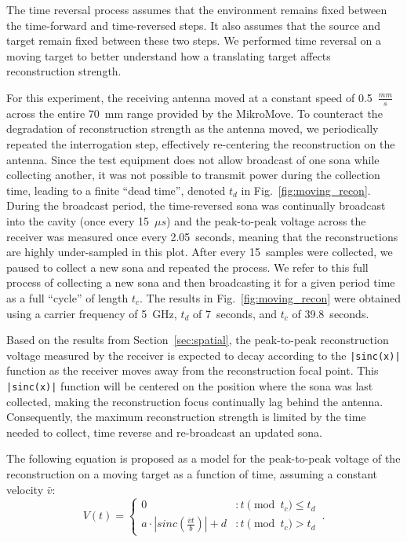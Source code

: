 The time reversal process assumes that the environment remains fixed between the
time-forward and time-reversed steps.
%
It also assumes that the source and target remain fixed between these two steps.
%
We performed time reversal on a moving target to better understand how a
translating target affects reconstruction strength.



For this experiment, the receiving antenna moved at a constant speed of
0.5~$\frac{mm}{s}$ across the entire 70~mm range provided by the MikroMove.
%
To counteract the degradation of reconstruction strength as the antenna moved,
we periodically repeated the interrogation step, effectively re-centering the
reconstruction on the antenna.
%
Since the test equipment does not allow broadcast of one sona while collecting
another, it was not possible to transmit power during the collection time,
leading to a finite ``dead time'', denoted $t_d$ in Fig.~\ref{fig:moving_recon}.
%
During the broadcast period, the time-reversed sona was continually broadcast
into the cavity (once every 15~$\mu s$) and the peak-to-peak voltage across the
receiver was measured once every 2.05~seconds, meaning that the reconstructions
are highly under-sampled in this plot.
%
After every 15~samples were collected, we paused to collect a new sona and
repeated the process. We refer to this full process of collecting a new sona and
then broadcasting it for a given period time as a full ``cycle'' of length
$t_c$.
%
The results in Fig.~\ref{fig:moving_recon} were obtained using a carrier
frequency of 5~GHz, $t_d$ of 7~seconds, and $t_c$ of 39.8~seconds.



Based on the results from Section~\ref{sec:spatial}, the peak-to-peak
reconstruction voltage measured by the receiver is expected to decay according
to the \texttt{|sinc(x)|} function as the receiver moves away from the
reconstruction focal point.
%
This \texttt{|sinc(x)|} function will be centered on the position where the sona
was last collected, making the reconstruction focus continually lag behind the
antenna.
%
Consequently, the maximum reconstruction strength is limited by the time needed
to collect, time reverse and re-broadcast an updated sona.



The following equation is proposed as a model for the peak-to-peak voltage of
the reconstruction on a moving target as a function of time, assuming a constant
velocity $\bar{v}$:
%
\begin{equation}\label{eq:vt}
  V(t) = \left\{
        \begin{array}{lr}
                0 & : t\pmod{t_c} \le t_d \\
                a\cdot \left|sinc\left(\frac{\bar{v}t}{b}\right)\right|+d & : t\pmod{t_c} > t_d
        \end{array}\,.
  \right.
\end{equation}



